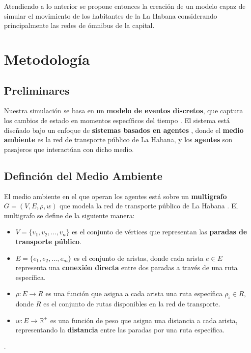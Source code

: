 \documentclass[a4paper,12pt]{article}
\begin{document}
Atendiendo a lo anterior se propone entonces la creaci\'on de un modelo capaz de simular el movimiento de los habitantes de la La Habana considerando principalmente las redes de \'omnibus de la capital. 

\section{Metodología}
\subsection{Preliminares}
Nuestra simulación se basa en un \textbf{modelo de eventos discretos}, que captura los cambios de estado en momentos específicos del tiempo \cite{law2014simulation}. El sistema está diseñado bajo un enfoque de \textbf{sistemas basados en agentes} \cite{wooldridge2009introduction}, donde el \textbf{medio ambiente} es la red de transporte público de La Habana, y los \textbf{agentes} son pasajeros que interactúan con dicho medio.

\subsection{Definci\'on del Medio Ambiente}
\label{medio_ambiente}

El medio ambiente en el que operan los agentes está sobre un \textbf{multigrafo} $G = (V, E, \rho, w)$ que modela la red de transporte público de La Habana \cite{evans2021public}. El multigrafo se define de la siguiente manera:

\begin{itemize}
    \item $V = \{v_1, v_2, \dots, v_n\}$ es el conjunto de vértices que representan las \textbf{paradas de transporte público}.
    \item $E = \{e_1, e_2, \dots, e_m\}$ es el conjunto de aristas, donde cada arista $e \in E$ representa una \textbf{conexión directa} entre dos paradas a través de una ruta específica.
    \item $\rho: E \rightarrow R$ es una función que asigna a cada arista una ruta específica $\rho_i \in R$, donde $R$ es el conjunto de rutas disponibles en la red de transporte.
    \item $w: E \rightarrow \mathbb{R}^+$ es una función de peso que asigna una distancia a cada arista, representando la \textbf{distancia} entre las paradas por una ruta específica.
\end{itemize}.
\end{document}

